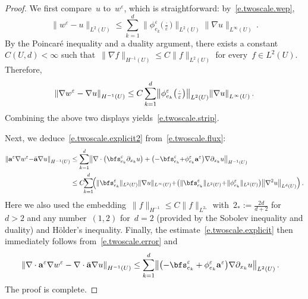 \documentclass[11pt,twoside]{article} %
\numberwithin{equation}{section}
\theoremstyle{definition}
\let\originalleft\left
\let\originalright\right
\renewcommand{\left}{\mathopen{}\mathclose\bgroup\originalleft}
\renewcommand{\right}{\aftergroup\egroup\originalright}
\newcommand{\eps}{\varepsilon}
\newcommand{\ep}{\eps}
\renewcommand{\a}{\mathbf{a}}
\newcommand{\ahom}{\bar{\a}}
\begin{document}
\begin{proof}
We first compare~$u$ to~$w^\ep$, which is straightforward: by~\eqref{e.twoscale.wep}, 
\begin{equation*}
\| w^\ep - u  \|_{L^2(U)} 
\leq
\sum_{k=1}^d  
\| \phi_{e_k}^\ep\bigl( \tfrac \cdot \ep\bigr) \|_{L^2(U)}
\| \nabla u \|_{L^\infty(U)}
\,.
\end{equation*}
By the Poincar\'e inequality and a duality argument, there exists a constant~$C(U,d)<\infty$ such that~$\| \nabla f \|_{H^{-1}(U)} \leq C \| f  \|_{L^2(U)}$ for every~$f\in L^2(U)$. Therefore,
\begin{equation*}
\left\| 
\nabla w^\ep - \nabla u \right\|_{H^{-1}(U)} 
\leq
C
\sum_{k=1}^d  
\left\| \phi_{e_k}^\ep\bigl( \tfrac \cdot \ep\bigr) \right\|_{L^2(U)}
\left\| \nabla u \right\|_{L^\infty(U)}
\,.
\end{equation*}
Combining the above two displays yields~\eqref{e.twoscale.strip}.

\smallskip

Next, we deduce~\eqref{e.twoscale.explicit2} from~\eqref{e.twoscale.flux}:
\begin{align*}
\left\| 
\a^\ep \nabla w^\ep {-} \ahom \nabla u \right\|_{H^{{-}1}(U)} 
&
\leq
\sum_{k=1}^d 
\bigl\| 
\nabla \cdot \left( \bfs^\ep_{e_k}  \partial_{x_k} u  \right)
+
\bigl( - \bfs^\ep_{e_k} {+} \phi_{e_k}^\ep \a^\ep \bigr) \nabla \partial_{x_k} u
\bigr\|_{H^{-1}(U)} 
\\  &
\leq
C \! \! \sum_{k=1}^d \!
\left( 
\| \bfs_{e_k}^\ep  \|_{L^2(U)} \| \nabla u \|_{L^{\infty}(U)}  
 {+} 
\bigl( 
\| \bfs_{e_k}^\ep  \|_{L^2(U)} {+} \| \phi_{e_k}^\ep  \|_{L^2(U)}
\bigr)  
\left\| \nabla^2 u \right\|_{L^{d}(U)}  
 \right) 
\,.
\end{align*}
Here we also used the embedding~$\| f \|_{H^{-1}} \leq C \| f \|_{L^{2_\ast}}$ with~$2_\ast := \frac{2d}{d+2}$ for~$d>2$ and any number~$(1,2)$ for~$d=2$ (provided by the Sobolev inequality and duality) and H\"older's inequality.
Finally, the estimate~\eqref{e.twoscale.explicit} then immediately follows from~\eqref{e.twoscale.error} and
\begin{align*}
\left\|
\nabla \cdot \a^\ep \nabla w^\ep 
-
\nabla\cdot \ahom \nabla u
\right\|_{H^{-1}(U)} 
&
\leq
\sum_{k=1}^d 
\left\| 
\left(
- \bfs_{e_k}^\ep 
+
\phi_{e_k}^\ep \a^\ep 
\right) \nabla \partial_{x_k} u 
\right\|_{L^2(U)}
\, .
\end{align*}
The proof is complete. 
\end{proof}
\end{document}
